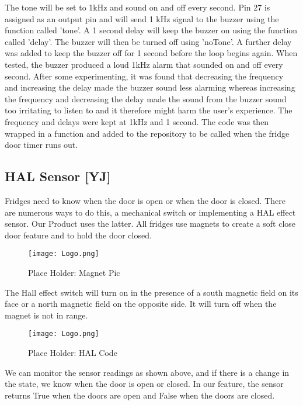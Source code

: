 The tone will be set to 1kHz and sound on and off every second.
Pin 27 is assigned as an output pin and will send 1 kHz signal to the buzzer using the function called 'tone'.
A 1 second delay will keep the buzzer on using the function called 'delay'.
The buzzer will then be turned off using 'noTone'.
A further delay was added to keep the buzzer off for 1 second before the loop begins again.
When tested, the buzzer produced a loud 1kHz alarm that sounded on and off every second.
After some experimenting, it was found that decreasing the frequency and increasing the delay made the buzzer sound less alarming whereas increasing the frequency and decreasing the delay made the sound from the buzzer sound too irritating to listen to and it therefore might harm the user's experience.
The frequency and delays were kept at 1kHz and 1 second.
The code was then wrapped in a function and added to the repository to be called when the fridge door timer runs out.


\subsection{HAL Sensor [YJ]}

Fridges need to know when the door is open or when the door is closed.
There are numerous ways to do this, a mechanical switch or implementing a HAL effect sensor.
Our Product uses the latter.
All fridges use magnets to create a soft close door feature and to hold the door closed.

\begin{figure}[H]        
    \centering
    \texttt{[image: Logo.png]}
    \caption{Place Holder: Magnet Pic}
    \label{fig:placeholder}
\end{figure} 

The Hall effect switch will turn on in the presence of a south magnetic field on its face or a north magnetic field on the opposite side.
It will turn off when the magnet is not in range.

\begin{figure}[H]        
    \centering
    \texttt{[image: Logo.png]}
    \caption{Place Holder: HAL Code}
    \label{fig:placeholder}
\end{figure} 

We can monitor the sensor readings as shown above, and if there is a change in the state, we know when the door is open or closed.
In our feature, the sensor returns True when the doors are open and False when the doors are closed.

